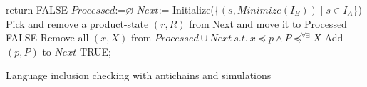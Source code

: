 \begin{algorithm}[H]
	\label{algAntichain}
			{return FALSE\;}
		$Processed$:=$\varnothing$\;
		$Next$:= Initialize(\{$(s,Minimize(I_B))\mid s\in I_A$\})\;
		{
			Pick and remove a product-state $(r,R)$ from Next and move it to Processed\;
			{
				{
					\Return FALSE\;}
					{
						{
							{
							 Remove all $(x,X)$ from $Processed\cup Next\ s.t.\ x\preceq p \wedge P\preceq^{\forall \exists}X$\;
							 Add $(p,P)$ to $Next$\;
							}
						}
				 }
		  }
		}
		\Return TRUE;
	\caption{Language inclusion checking with antichains and simulations}
\end{algorithm}\

